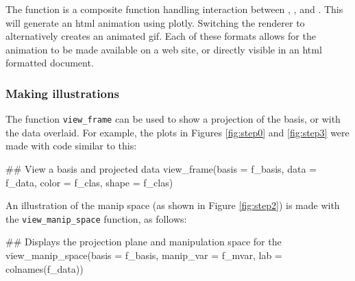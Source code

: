 \begin{Schunk}
\end{Schunk}

\noindent The  function is a composite
function handling interaction between ,
, and . This will generate an
html animation using plotly. Switching the renderer to
 alternatively creates an animated gif. Each
of these formats allows for the animation to be made available on a web
site, or directly visible in an html formatted document.

\hypertarget{making-illustrations}{%
\subsubsection{Making illustrations}\label{making-illustrations}}

The function \texttt{view\_frame} can be used to show a projection of
the basis, or with the data overlaid. For example, the plots in Figures
\ref{fig:step0} and \ref{fig:step3} were made with code similar to this:

\begin{Schunk}
\begin{Sinput}
## View a basis and projected data 
view_frame(basis = f_basis, 
              data = f_data,
              color = f_clas,
              shape = f_clas)
\end{Sinput}
\end{Schunk}

\noindent An illustration of the manip space (as shown in Figure
\ref{fig:step2}) is made with the \texttt{view\_manip\_space} function,
as follows:

\begin{Schunk}
\begin{Sinput}
## Displays the projection plane and manipulation space for the 
view_manip_space(basis = f_basis, 
                 manip_var = f_mvar, 
                 lab = colnames(f_data))
\end{Sinput}
\end{Schunk}

